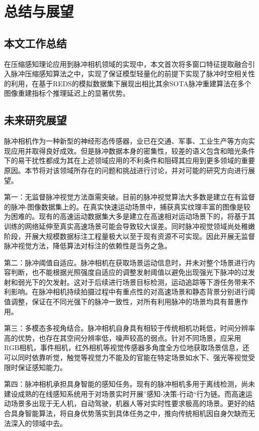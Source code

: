 \chapter{总结与展望}

\section{本文工作总结}
在压缩感知理论应用到脉冲相机领域的实现中，本文首次将多窗口特征提取融合引入脉冲压缩感知算法之中，实现了保证模型轻量化的前提下实现了脉冲时空相关性的利用，在基于REDS的模拟数据集下展现出相比其余SOTA脉冲重建算法在多个图像重建指标个推理延迟上的显著优势。

\section{未来研究展望}
脉冲相机作为一种新型的神经形态传感器，业已在交通、军事、工业生产等方向实现应用并取得良好成效。但是脉冲数据本身的密集性，较差的语义包含和暗光条件下的易干扰性都成为其在上述领域应用的不利条件和阻碍其应用到更多领域的重要原因。本节将对该领域所存在的问题和挑战进行讨论，并对可能的研究方向进行展望。

第一：无监督脉冲视觉方法亟需突破。目前的脉冲视觉算法大多数是建立在有监督的脉冲-图像数据集上的。在真实快速运动场景中，捕获真实纹理丰富的图像是较为困难的。现有的高速运动数据集大多是建立在高速相对运动场景下的，将基于其训练的网络延伸至真实高速场景可能会导致较大误差。同时脉冲视觉领域尚处稚嫩阶段，开展大规模数据标注工程量极大以至于现有资源不可实现。因此开展无监督脉冲视觉方法，降低算法对标注的依赖性是当务之急。

第二：脉冲阈值自适应。脉冲相机在获取场景运动信息时，并未对整个场景进行内容判断，也不能根据光照强度自适应的调整发射阈值以避免出现强光下脉冲的过发射和弱光下的欠发射。这对于后续进行场景目标检测，运动追踪等下游任务带来不利影响。在脉冲相机持续拍摄过程中有重点性的对高速场景和静态背景分别进行阈值调整，保证在不同光强下的脉冲一致性，对所有利用脉冲的场景均具有普惠作用。

第三：多模态多视角结合。脉冲相机自身具有相较于传统相机功耗低，时间分辨率高的优势，也存在其空间分辨率低，噪声较高的弱点。针对不同场景，应采用RGB相机，事件相机，红外相机等视觉传感器多角度全方位地获取场景信息，还可以同时依靠听觉，触觉等视觉力不能及的官能在特定场景如水下、强光等视觉受限时保证感知能力。

第四：脉冲相机承担具身智能的感知任务。现有的脉冲相机多用于离线检测，尚未建设成熟的在线感知系统用于对场景实时开展”感知-决策-行动“行为链。而高速运动场景多出现于无人机，自动驾驶，机器人等对实时性要求极高的场景。更好的结合具身智能算法，将自身优势落实到具体任务之中，推向传统相机因自身欠缺而无法深入的领域中去。
